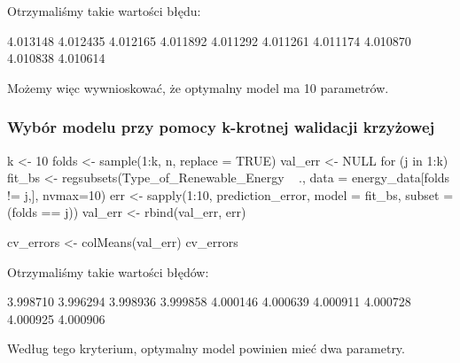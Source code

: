 Otrzymaliśmy takie wartości błędu: 
\begin{Rcode}
4.013148 4.012435 4.012165 4.011892 4.011292 4.011261 4.011174 4.010870 4.010838 4.010614
\end{Rcode}
Możemy więc wywnioskować, że optymalny model ma 10 parametrów.

\subsubsection{Wybór modelu przy pomocy k-krotnej walidacji krzyżowej}

\begin{Rcode}
k <- 10
folds <- sample(1:k, n, replace = TRUE)
val_err <- NULL
for (j in 1:k) {
  fit_bs <- regsubsets(Type_of_Renewable_Energy ~ ., data = energy_data[folds != j,], nvmax=10)
  err <- sapply(1:10, prediction_error, model = fit_bs, subset = (folds == j))
  val_err <- rbind(val_err, err)
}

cv_errors <- colMeans(val_err)
cv_errors
\end{Rcode}

Otrzymaliśmy takie wartości błędów:

\begin{Rcode}
3.998710 3.996294 3.998936 3.999858 4.000146 4.000639 4.000911 4.000728 4.000925 4.000906
\end{Rcode}

Według tego kryterium, optymalny model powinien mieć dwa parametry.